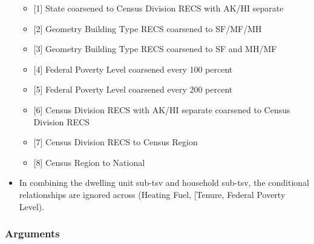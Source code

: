 \begin{itemize}
\begin{itemize}
  \item
    {[}1{]} State coarsened to Census Division RECS with AK/HI separate
  \item
    {[}2{]} Geometry Building Type RECS coarsened to SF/MF/MH
  \item
    {[}3{]} Geometry Building Type RECS coarsened to SF and MH/MF
  \item
    {[}4{]} Federal Poverty Level coarsened every 100 percent
  \item
    {[}5{]} Federal Poverty Level coarsened every 200 percent
  \item
    {[}6{]} Census Division RECS with AK/HI separate coarsened to Census
    Division RECS
  \item
    {[}7{]} Census Division RECS to Census Region
  \item
    {[}8{]} Census Region to National
  \end{itemize}
\item
  In combining the dwelling unit sub-tsv and household sub-tsv, the
  conditional relationships are ignored across (\textquotesingle Heating
  Fuel\textquotesingle, {[}\textquotesingle Tenure\textquotesingle,
  \textquotesingle Federal Poverty Level\textquotesingle{]}).
\end{itemize}

\subsubsection{Arguments}\label{arguments-79}

